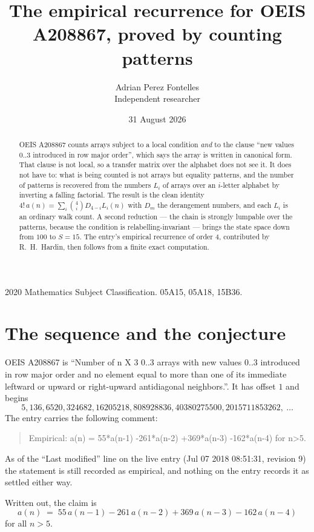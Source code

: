 \documentclass[11pt,a4paper]{article}
\title{The empirical recurrence for OEIS A208867, proved by counting patterns}
\author{Adrian Perez Fontelles\\ \small Independent researcher}
\date{31 August 2026}
\theoremstyle{plain}
\theoremstyle{definition}
\begin{document}
\maketitle

\begin{abstract}
OEIS A208867 counts arrays subject to a local condition \emph{and} to the clause ``new values
$0..3$ introduced in row major order'', which says the array is written in canonical
form. That clause is not local, so a transfer matrix over the alphabet does not see it. It
does not have to: what is being counted is not arrays but equality patterns, and the number
of patterns is recovered from the numbers $L_i$ of arrays over an $i$-letter alphabet by
inverting a falling factorial. The result is the clean identity
$4!\,a(n)=\sum_i\binom{4}{i}D_{4-i}L_i(n)$ with $D_m$ the derangement numbers,
and each $L_i$ is an ordinary walk count. A second reduction --- the chain is strongly
lumpable over the patterns, because the condition is relabelling-invariant --- brings the
state space down from $100$ to $S=15$. The entry's empirical recurrence of order
$4$, contributed by R.~H.~Hardin, then follows from a finite exact computation.
\end{abstract}

\noindent\small 2020 Mathematics Subject Classification. 05A15, 05A18, 15B36.\normalsize

\section{The sequence and the conjecture}

OEIS A208867 is ``Number of n X 3 0..3 arrays with new values 0..3 introduced in row major order and no element equal to more than one of its immediate leftward or upward or right-upward antidiagonal neighbors.''. It has offset $1$ and begins
\[
5, 136, 6520, 324682, 16205218, 808928836, 40380275500, 2015711853262,\ \dots
\]
The entry carries the following comment:
\begin{quote}\small
Empirical: a(n) = 55*a(n-1) -261*a(n-2) +369*a(n-3) -162*a(n-4) for n>5.
\end{quote}
As of the ``Last modified'' line on the live entry (Jul 07 2018 08:51:31, revision 9) the statement is
still recorded as empirical, and nothing on the entry records it as settled either way.

Written out, the claim is
\begin{equation}\label{eq:conj}
a(n)\;=\;55\,a(n-1) - 261\,a(n-2) + 369\,a(n-3) - 162\,a(n-4)
\end{equation}
for all $n>5$.
\end{document}
